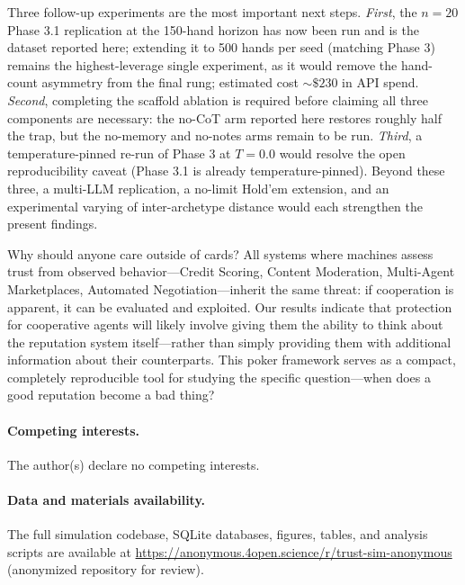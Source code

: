 \documentclass[journal]{IEEEtran}
\begin{document}
Three follow-up experiments are the most important next steps.
\textit{First}, the $n = 20$ Phase 3.1 replication at the 150-hand horizon has now been run and is the dataset reported here; extending it to 500 hands per seed (matching Phase 3) remains the highest-leverage single experiment, as it would remove the hand-count asymmetry from the final rung; estimated cost ${\sim}\$230$ in API spend.
\textit{Second}, completing the scaffold ablation is required before claiming all three components are necessary: the no-CoT arm reported here restores roughly half the trap, but the no-memory and no-notes arms remain to be run.
\textit{Third}, a temperature-pinned re-run of Phase 3 at $T = 0.0$ would resolve the open reproducibility caveat (Phase 3.1 is already temperature-pinned).
Beyond these three, a multi-LLM replication, a no-limit Hold'em
extension, and an experimental varying of inter-archetype distance
would each strengthen the present findings.

Why should anyone care outside of cards? All systems where machines
assess trust from observed behavior---Credit Scoring, Content
Moderation, Multi-Agent Marketplaces, Automated Negotiation---inherit
the same threat: if cooperation is apparent, it can be evaluated and
exploited. Our results indicate that protection for cooperative
agents will likely involve giving them the ability to think about the
reputation system itself---rather than simply providing them with
additional information about their counterparts. This poker framework
serves as a compact, completely reproducible tool for studying the
specific question---when does a good reputation become a bad thing?

\paragraph*{Competing interests.} The author(s) declare no competing
interests.

\paragraph*{Data and materials availability.}
The full simulation codebase, SQLite databases, figures, tables,
and analysis scripts are available at
\url{https://anonymous.4open.science/r/trust-sim-anonymous}
(anonymized repository for review).


\end{document}
